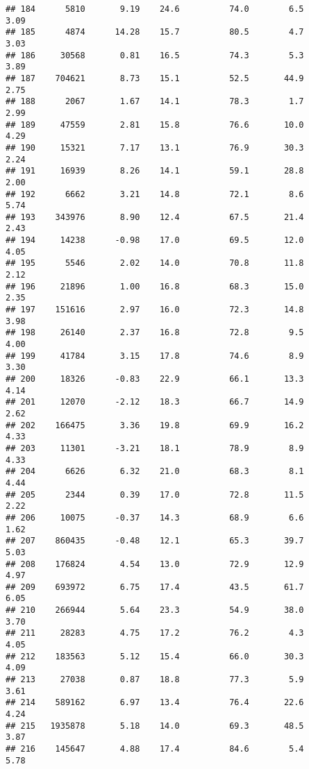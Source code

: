 \documentclass[
]{article}
\begin{document}
\begin{verbatim}
## 184      5810       9.19    24.6          74.0        6.5              3.09
## 185      4874      14.28    15.7          80.5        4.7              3.03
## 186     30568       0.81    16.5          74.3        5.3              3.89
## 187    704621       8.73    15.1          52.5       44.9              2.75
## 188      2067       1.67    14.1          78.3        1.7              2.99
## 189     47559       2.81    15.8          76.6       10.0              4.29
## 190     15321       7.17    13.1          76.9       30.3              2.24
## 191     16939       8.26    14.1          59.1       28.8              2.00
## 192      6662       3.21    14.8          72.1        8.6              5.74
## 193    343976       8.90    12.4          67.5       21.4              2.43
## 194     14238      -0.98    17.0          69.5       12.0              4.05
## 195      5546       2.02    14.0          70.8       11.8              2.12
## 196     21896       1.00    16.8          68.3       15.0              2.35
## 197    151616       2.97    16.0          72.3       14.8              3.98
## 198     26140       2.37    16.8          72.8        9.5              4.00
## 199     41784       3.15    17.8          74.6        8.9              3.30
## 200     18326      -0.83    22.9          66.1       13.3              4.14
## 201     12070      -2.12    18.3          66.7       14.9              2.62
## 202    166475       3.36    19.8          69.9       16.2              4.33
## 203     11301      -3.21    18.1          78.9        8.9              4.33
## 204      6626       6.32    21.0          68.3        8.1              4.44
## 205      2344       0.39    17.0          72.8       11.5              2.22
## 206     10075      -0.37    14.3          68.9        6.6              1.62
## 207    860435      -0.48    12.1          65.3       39.7              5.03
## 208    176824       4.54    13.0          72.9       12.9              4.97
## 209    693972       6.75    17.4          43.5       61.7              6.05
## 210    266944       5.64    23.3          54.9       38.0              3.70
## 211     28283       4.75    17.2          76.2        4.3              4.05
## 212    183563       5.12    15.4          66.0       30.3              4.09
## 213     27038       0.87    18.8          77.3        5.9              3.61
## 214    589162       6.97    13.4          76.4       22.6              4.24
## 215   1935878       5.18    14.0          69.3       48.5              3.87
## 216    145647       4.88    17.4          84.6        5.4              5.78

\end{verbatim}
\end{document}
